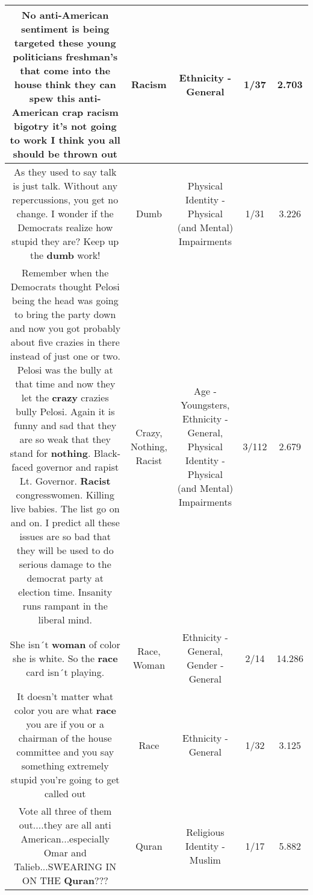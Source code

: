\documentclass[11pt]{article}
\newlength\mylength
\begin{document}
\begin{center}
\begin{longtable}{|C{.65\mylength}|C{.30\mylength}|C{.12\mylength}|C{.12\mylength}|C{.12\mylength}|}
  \small No anti-American sentiment is being targeted these young politicians freshman's that come into the house think they can spew this anti-American crap \textbf{racism} bigotry it's not going to work I think you all should be thrown out\normalsize   & Racism & Ethnicity - General & 1/37 & 2.703 \\  \hline
  \small As they used to say talk is just talk. Without any repercussions, you get no change. I wonder if the Democrats realize how stupid they are? Keep up the \textbf{dumb} work!\normalsize   & Dumb & Physical Identity - Physical (and Mental) Impairments & 1/31 & 3.226 \\  \hline
  \small Remember when the Democrats thought Pelosi being the head was going to bring the party down and now you got probably about five crazies in there instead of just one or two. Pelosi was the bully at that time and now they let the \textbf{crazy} crazies bully Pelosi. Again it is funny and sad that they are so weak that they stand for \textbf{nothing}. Black-faced governor and rapist Lt. Governor. \textbf{Racist} congresswomen. Killing live babies. The list go on and on. I predict all these issues are so bad that they will be used to do serious damage to the democrat party at election time. Insanity runs rampant in the liberal mind.\normalsize   & Crazy, Nothing, Racist & Age - Youngsters, Ethnicity - General, Physical Identity - Physical (and Mental) Impairments & 3/112 & 2.679 \\  \hline
  \small She isn´t \textbf{woman} of color she is white. So the \textbf{race} card isn´t playing.\normalsize   & Race, Woman & Ethnicity - General, Gender - General & 2/14 & 14.286 \\  \hline
  \small It doesn't matter what color you are what \textbf{race} you are if you or a chairman of the house committee and you say something extremely stupid you're going to get called out\normalsize   & Race & Ethnicity - General & 1/32 & 3.125 \\  \hline
  \small Vote all three of them out....they are all anti American...especially Omar and Talieb...SWEARING IN ON THE \textbf{Quran}???\normalsize   & Quran & Religious Identity - Muslim & 1/17 & 5.882 \\  \hline

\end{longtable}
\end{center}
\end{document}
